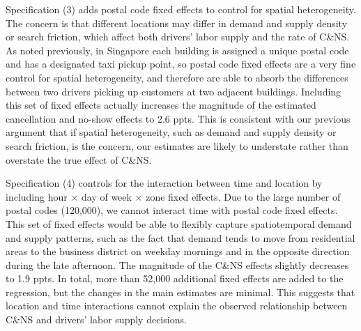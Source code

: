 \documentclass[reviewmode]{restat}
\begin{document}
Specification (3) adds postal code fixed effects to control for spatial heterogeneity. The concern is that 
different locations may differ in demand and supply density or search friction, which affect both drivers' 
labor supply and the rate of C\&NS. As noted previously, in Singapore each building is assigned a unique postal 
code and has a designated taxi pickup point, so postal code fixed effects are a very fine control for spatial
heterogeneity, and therefore are able to absorb the differences between two drivers picking up customers at 
two adjacent buildings. Including this set of fixed effects actually increases the magnitude of the estimated 
cancellation and no-show effects to 2.6 ppts. This is consistent with our previous argument that if spatial 
heterogeneity, such as demand and supply density or search friction, is the concern, our estimates are likely 
to understate rather than overstate the true effect of C\&NS.

Specification (4) controls for the interaction between time and location by including hour $\times$ day of
week $\times$ zone fixed effects. Due to the large number of postal codes (120,000), we cannot interact time 
with postal code fixed effects. 
This set of fixed effects would be able to flexibly capture spatiotemporal demand and supply patterns, such 
as the fact that demand tends to move from residential areas to the business district on weekday mornings and
in the opposite direction during the late afternoon. The magnitude of the C\&NS effects slightly decreases
to 1.9 ppts. In total, more than 52,000 additional fixed effects are added to the regression, but the changes
in the main estimates are minimal. This suggests that location and time interactions cannot explain the 
observed relationship between C\&NS and drivers' labor supply decisions.
\end{document}
